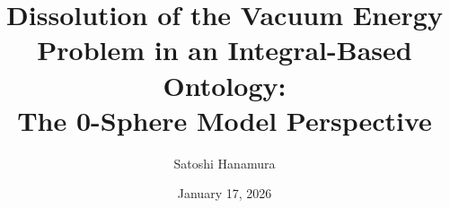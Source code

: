 \documentclass[%
 reprint,
 amsmath,amssymb,
 aps,
 prb,
]{revtex4-2}
\numberwithin{equation}{section}
\begin{document}
\title{Dissolution of the Vacuum Energy Problem in an Integral-Based Ontology:\\ The 0-Sphere Model Perspective}

\author{Satoshi Hanamura}
\date{January 17, 2026}


\end{document}
